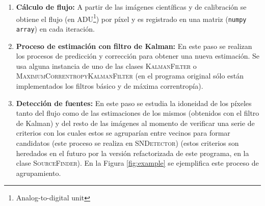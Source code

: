 \begin{enumerate}
\item \textbf{C\'alculo de flujo:} A partir de las im\'agenes cient\'ificas y de calibraci\'on se obtiene el flujo (en ADU\footnote{Analog-to-digital unit}) por p\'ixel y es registrado en una matriz (\texttt{numpy array}) en cada iteraci\'on. 
\item \textbf{Proceso de estimaci\'on con filtro de Kalman:} En este paso se realizan los procesos de predicci\'on y correcci\'on para obtener una nueva estimaci\'on. Se usa alguna instancia de uno de las clases \textsc{KalmanFilter} o \textsc{MaximumCorrentropyKalmanFilter} (en el programa original s\'olo est\'an implementados los filtros b\'asico y de m\'axima correntrop\'ia). 
\item \textbf{Detecci\'on de fuentes:} En este paso se estudia la idoneidad de los p\'ixeles tanto del flujo como de las estimaciones de los mismos (obtenidos con el filtro de Kalman) y del resto de las im\'agenes al momento de verificar una serie de criterios con los cuales estos se agrupar\'ian entre vecinos para formar candidatos (este proceso se realiza en \textsc{SNDetector}) (estos criterios son heredados en el futuro por la versi\'on refactorizada de este programa, en la clase \textsc{SourceFinder}). En la Figura \ref{fig:example}
se ejemplifica este proceso de agrupamiento.


\end{enumerate}

